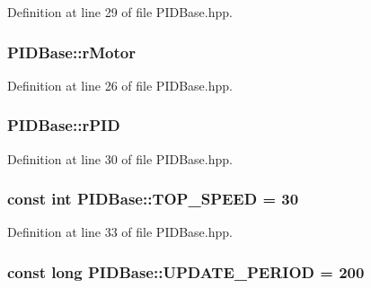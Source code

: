 Definition at line 29 of file P\-I\-D\-Base.\-hpp.

\hypertarget{classPIDBase_ae52cf8a147c90af4334e1ad14f48aa4a}{
\subsubsection[{r\-Motor}]{ P\-I\-D\-Base\-::r\-Motor\hspace{0.3cm}{\ttfamily [private]}}}\label{classPIDBase_ae52cf8a147c90af4334e1ad14f48aa4a}


Definition at line 26 of file P\-I\-D\-Base.\-hpp.

\hypertarget{classPIDBase_a940d3dae6038a472ea613c03c5be3846}{
\subsubsection[{r\-P\-I\-D}]{ P\-I\-D\-Base\-::r\-P\-I\-D\hspace{0.3cm}{\ttfamily [private]}}}\label{classPIDBase_a940d3dae6038a472ea613c03c5be3846}


Definition at line 30 of file P\-I\-D\-Base.\-hpp.

\hypertarget{classPIDBase_a42e66aae0ea7d5a54bffc062cc3ebf2b}{
\subsubsection[{T\-O\-P\-\_\-\-S\-P\-E\-E\-D}]{\setlength{\rightskip}{0pt plus 5cm}const int P\-I\-D\-Base\-::\-T\-O\-P\-\_\-\-S\-P\-E\-E\-D = 30\hspace{0.3cm}{\ttfamily [private]}}}\label{classPIDBase_a42e66aae0ea7d5a54bffc062cc3ebf2b}


Definition at line 33 of file P\-I\-D\-Base.\-hpp.

\hypertarget{classPIDBase_a6756b30f25632224de999cb7a4ff2315}{
\subsubsection[{U\-P\-D\-A\-T\-E\-\_\-\-P\-E\-R\-I\-O\-D}]{\setlength{\rightskip}{0pt plus 5cm}const long P\-I\-D\-Base\-::\-U\-P\-D\-A\-T\-E\-\_\-\-P\-E\-R\-I\-O\-D = 200\hspace{0.3cm}{\ttfamily [private]}}}\label{classPIDBase_a6756b30f25632224de999cb7a4ff2315}


